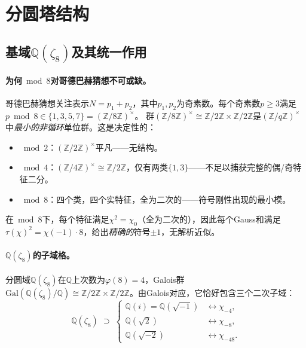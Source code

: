 \documentclass[11pt,a4paper]{article}
\theoremstyle{remark}
\newcommand{\Z}{\mathbb{Z}}
\newcommand{\Q}{\mathbb{Q}}
\begin{document}
\section{分圆塔结构}
\label{sec:tower}

\subsection{基域$\Q(\zeta_8)$及其统一作用}
\label{subsec:why-zeta8}

\paragraph{为何$\bmod 8$对哥德巴赫猜想不可或缺。}
哥德巴赫猜想关注表示$N = p_1 + p_2$，其中$p_1, p_2$为奇素数。每个奇素数$p \geq 3$满足$p \bmod 8 \in \{1, 3, 5, 7\} = (\Z/8\Z)^\times$。
群$(\Z/8\Z)^\times \cong \Z/2\Z \times \Z/2\Z$是$(\Z/q\Z)^\times$中\emph{最小的非循环}单位群。这是决定性的：
\begin{itemize}[nosep]
  \item $\bmod 2$：$(\Z/2\Z)^\times$平凡——无结构。
  \item $\bmod 4$：$(\Z/4\Z)^\times \cong \Z/2\Z$，仅有两类$\{1,3\}$——不足以捕获完整的偶/奇特征二分。
  \item $\bmod 8$：四个类，四个实特征，全为二次的——符号刚性出现的最小模。
\end{itemize}
在$\bmod 8$下，每个特征满足$\chi^2 = \chi_0$（全为二次的），因此每个Gauss和满足$\tau(\chi)^2 = \chi(-1) \cdot 8$，给出\emph{精确的}符号$\pm 1$，无解析近似。

\paragraph{$\Q(\zeta_8)$的子域格。}
分圆域$\Q(\zeta_8)$在$\Q$上次数为$\varphi(8) = 4$，Galois群$\mathrm{Gal}(\Q(\zeta_8)/\Q) \cong \Z/2\Z \times \Z/2\Z$。由Galois对应，它恰好包含三个二次子域：
\begin{equation}
\label{eq:zeta8-subfields}
  \Q(\zeta_8) \;\supset\; \begin{cases}
    \Q(i) = \Q(\sqrt{-1}) & \longleftrightarrow \chi_{-4}, \\[3pt]
    \Q(\sqrt{2}) & \longleftrightarrow \chi_{-8}, \\[3pt]
    \Q(\sqrt{-2}) & \longleftrightarrow \chi_{-48}.
  \end{cases}
\end{equation}
\end{document}
